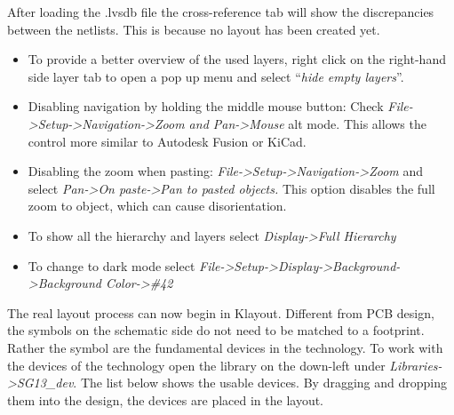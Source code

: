 \documentclass[
  letterpaper,
]{scrbook}
\begin{document}
After loading the .lvsdb file the cross-reference tab will show the
discrepancies between the netlists. This is because no layout has been
created yet.

\begin{tcolorbox}[enhanced jigsaw, title=\textcolor{quarto-callout-tip-color}{\faLightbulb}\hspace{0.5em}{Some quality-of-life options}, colback=white, bottomrule=.15mm, coltitle=black, colbacktitle=quarto-callout-tip-color!10!white, toptitle=1mm, colframe=quarto-callout-tip-color-frame, rightrule=.15mm, arc=.35mm, leftrule=.75mm, bottomtitle=1mm, titlerule=0mm, toprule=.15mm, opacitybacktitle=0.6, opacityback=0, left=2mm, breakable]

\begin{itemize}
\item
  To provide a better overview of the used layers, right click on the
  right-hand side layer tab to open a pop up menu and select
  ``\emph{hide empty layers}''.
\item
  Disabling navigation by holding the middle mouse button: Check
  \emph{File-\textgreater Setup-\textgreater Navigation-\textgreater Zoom
  and Pan-\textgreater Mouse} alt mode. This allows the control more
  similar to Autodesk Fusion or KiCad.
\item
  Disabling the zoom when pasting:
  \emph{File-\textgreater Setup-\textgreater Navigation-\textgreater Zoom}
  and select \emph{Pan-\textgreater On paste-\textgreater Pan to pasted
  objects.} This option disables the full zoom to object, which can
  cause disorientation.
\item
  To show all the hierarchy and layers select
  \emph{Display-\textgreater Full Hierarchy}
\item
  To change to dark mode select
  \emph{File-\textgreater Setup-\textgreater Display-\textgreater Background-\textgreater Background
  Color-\textgreater\#42}
\end{itemize}

\end{tcolorbox}

The real layout process can now begin in Klayout. Different from PCB
design, the symbols on the schematic side do not need to be matched to a
footprint. Rather the symbol are the fundamental devices in the
technology. To work with the devices of the technology open the library
on the down-left under \emph{Libraries-\textgreater SG13\_dev}. The list
below shows the usable devices. By dragging and dropping them into the
design, the devices are placed in the layout.
\end{document}
